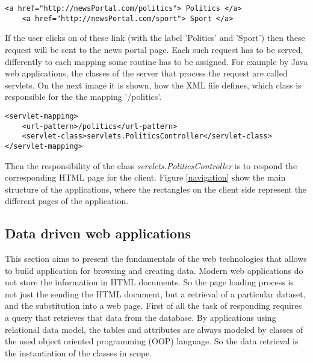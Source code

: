 \begin{lstlisting}[captionpos=b, caption=Example link definitions, label=skullJSON,
basicstyle=\footnotesize,frame=single]
	<a href="http://newsPortal.com/politics"> Politics </a>
	<a href="http://newsPortal.com/sport"> Sport </a>
\end{lstlisting}

If the user clicks on of these link (with the label 'Politics' and 'Sport') then these request will be sent to the news portal page. Each such request has to be served, differently to each mapping some routine has to be assigned. For example by Java web applications, the classes of the server that process the request are called servlets. On the next image it is shown, how the XML file defines, which class is responsible for the the mapping '/politics'.

\begin{lstlisting}[captionpos=b, caption=Java servlet mapping definition, label=skullJSON,
basicstyle=\footnotesize,frame=single]
<servlet-mapping>
	<url-pattern>/politics</url-pattern>
	<servlet-class>servlets.PoliticsController</servlet-class>
</servlet-mapping>
\end{lstlisting}


Then the responsibility of the class \textit{servlets.PoliticsController} is to respond the corresponding HTML page for the client. Figure \ref{navigation} show the main structure of the applications, where the rectangles on the client side represent the different pages of the application.




\subsection{Data driven web applications} \label{dataDriven}


This section aims to present the fundamentals of the web technologies that allows to build application for browsing and creating data. Modern web applications do not store the information in HTML documents. So the page loading process is not just the sending the HTML document, but a retrieval of a particular dataset, and the substitution into a web page. First of all the task of responding requires a query that retrieves that data from the database. By applications using relational data model, the tables and attributes are always modeled by classes of the used object oriented programming (OOP) language. So the data retrieval is the instantiation of the classes in scope. 

